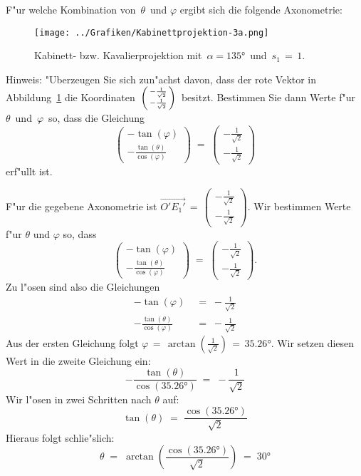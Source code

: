 \begin{Aufgabe}
\begin{Teilaufgaben}
\item F"ur welche Kombination von\, $\theta$\, und  $\varphi$ ergibt sich die folgende Axonometrie:
 \begin{figure}[ht]
  \centering
  \texttt{[image: ../Grafiken/Kabinettprojektion-3a.png]}
  \caption{Kabinett- bzw. Kavalierprojektion mit\, $\alpha = \ang{135}$\, und \,$s_1\, =\,1$.}
  \label{Kabinettproj}
  \end{figure}

  Hinweis: "Uberzeugen Sie sich zun"achst davon, dass der rote Vektor in Abbildung~\ref{Kabinettproj} die Koordinaten\, $\begin{psmallmatrix} - \frac{1}{\sqrt{2}}\\ - \frac{1}{\sqrt{2}} \end{psmallmatrix}$\, besitzt. Bestimmen Sie dann Werte f"ur\, $\theta$\, und\, $\varphi$\, so, dass die Gleichung \[\begin{pmatrix} - \tan(\varphi) \\ - \frac{\tan(\theta)}{\cos(\varphi)} \end{pmatrix}\;=\;\begin{pmatrix} - \frac{1}{\sqrt{2}}\\ - \frac{1}{\sqrt{2}} \end{pmatrix}\] erf"ullt ist.
\end{Teilaufgaben}
\end{Aufgabe}
%
\begin{Loesung}
\usetikzlibrary{calc}

	F"ur die gegebene Axonometrie ist $\overrightarrow{O'E_1'}\,=\,\begin{pmatrix}- \frac{1}{\sqrt{2}}\\- \frac{1}{\sqrt{2}}\end{pmatrix}$. Wir bestimmen Werte f"ur $\theta$ und $\varphi$ so, dass
	\[\begin{pmatrix}- \tan (\varphi)\\
	- \frac{\tan (\theta)}{\cos (\varphi)}\end{pmatrix}\;=\;\begin{pmatrix}- \frac{1}{\sqrt{2}}\\- \frac{1}{\sqrt{2}}\end{pmatrix}. 
	\] Zu l"osen sind also die Gleichungen \begin{align*}- \tan (\varphi)\;&=\;- \frac{1}{\sqrt{2}}\\ 
	- \frac{\tan (\theta)}{\cos (\varphi)}\;&=\;- \frac{1}{\sqrt{2}}
	\end{align*} Aus der ersten Gleichung folgt $\varphi\,=\,\arctan\left(\frac{1}{\sqrt{2}}\right)\,=\,\ang{35.26}$. Wir setzen diesen Wert in die zweite Gleichung ein: 
	\[- \frac{\tan (\theta)}{\cos \left(\ang{35.26}\right)}\;=\;- \frac{1}{\sqrt{2}}\] Wir l"osen in zwei Schritten nach $\theta$ auf: 
	\[\tan (\theta)\;=\;\frac{\cos \left(\ang{35.26}\right)}{\sqrt{2}}\] Hieraus folgt schlie"slich:
	\[\theta\;=\;\arctan\left(\frac{\cos \left(\ang{35.26}\right)}{\sqrt{2}}\right)\;=\;\ang{30}
	\]
\end{Loesung}